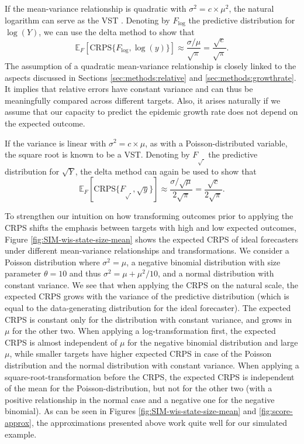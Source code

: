 \documentclass{article}
\begin{document}
If the mean-variance relationship is quadratic with $\sigma^2 = c \times \mu^2$, the natural logarithm can serve as the VST \citep{guerreroTimeseriesAnalysisSupported1993}. Denoting by $F_{\log}$ the predictive distribution for $\log(Y)$, we can use the delta method to show that
$$
\mathbb{E}_F[\text{CRPS}\{F_{\log}, \log(y)\}] \approx \frac{\sigma/\mu}{\sqrt{\pi}} 
= \frac{\sqrt{c}}{\sqrt{\pi}}
.
$$
The assumption of a quadratic mean-variance relationship is closely linked to the aspects discussed in Sections \ref{sec:methods:relative} and \ref{sec:methods:growthrate}. It implies that relative errors have constant variance and can thus be meaningfully compared across different targets. Also, it arises naturally if we assume that our capacity to predict the epidemic growth rate does not depend on the expected outcome.

If the variance is linear with $\sigma^2 = c \times \mu$, as with a Poisson-distributed variable, the square root is known to be a VST. 
Denoting by $F_{\sqrt{\ }}$ the predictive distribution for $\sqrt{Y}$, the delta method can again be used to show that
$$
\mathbb{E}_F[\text{CRPS}\{F_{\sqrt{\ }}, \sqrt{y}\}] \approx \frac{\sigma/\sqrt{\mu}}{2\sqrt{\pi}} = \frac{\sqrt{c}}{2\sqrt{\pi}}
.
$$

To strengthen our intuition on how transforming outcomes prior to applying the CRPS shifts the emphasis between targets with high and low expected outcomes, Figure \ref{fig:SIM-wis-state-size-mean} shows the expected CRPS of ideal forecasters under different mean-variance relationships and transformations. We consider a Poisson distribution where $\sigma^2 = \mu$, a negative binomial distribution with size parameter $\theta = 10$ and thus $\sigma^2 = \mu + \mu^2/10$, and a normal distribution with constant variance. We see that when applying the CRPS on the natural scale, the expected CRPS grows with the variance of the predictive distribution (which is equal to the data-generating distribution for the ideal forecaster). The expected CRPS is constant only for the distribution with constant variance, and grows in $\mu$ for the other two. When applying a log-transformation first, the expected CRPS is almost independent of $\mu$ for the negative binomial distribution and large $\mu$, while smaller targets have higher expected CRPS in case of the Poisson distribution and the normal distribution with constant variance. When applying a square-root-transformation before the CRPS, the expected CRPS is independent of the mean for the Poisson-distribution, but not for the other two (with a positive relationship in the normal case and a negative one for the negative binomial). As can be seen in Figures \ref{fig:SIM-wis-state-size-mean} and \ref{fig:score-approx}, the approximations presented above work quite well for our simulated example. 
\end{document}
